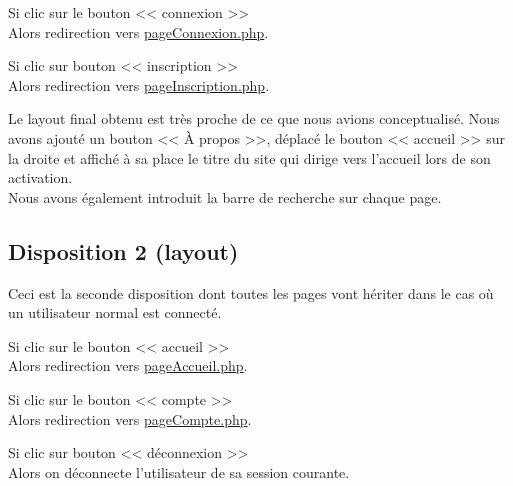 		\begin{paragraphe}
			Si clic sur le bouton << connexion >> \\
			Alors redirection vers \underline{pageConnexion.php}.
		\end{paragraphe}

		\begin{paragraphe}
			Si clic sur bouton << inscription >> \\
			Alors redirection vers \underline{pageInscription.php}.
		\end{paragraphe}


        \begin{paragraphe}
            Le layout final obtenu est très proche de ce que nous avions conceptualisé. Nous avons ajouté un bouton << À propos >>,
            déplacé le bouton << accueil >> sur la droite et affiché à sa place le titre du site qui dirige vers l'accueil lors de son activation.\\
            Nous avons également introduit la barre de recherche sur chaque page.
        \end{paragraphe}


    \newpage

	\subsection{Disposition 2 (layout)}

		\begin{paragraphe}
			Ceci est la seconde disposition dont toutes les pages vont hériter dans le cas où un utilisateur normal est connecté.
		\end{paragraphe}

		\begin{paragraphe}
			Si clic sur le bouton << accueil >> \\
			Alors redirection vers \underline{pageAccueil.php}.
		\end{paragraphe}

		\begin{paragraphe}
			Si clic sur le bouton << compte >> \\
			Alors redirection vers \underline{pageCompte.php}.
		\end{paragraphe}

		\begin{paragraphe}
			Si clic sur bouton << déconnexion >> \\
			Alors on déconnecte l'utilisateur de sa session courante.
		\end{paragraphe}

